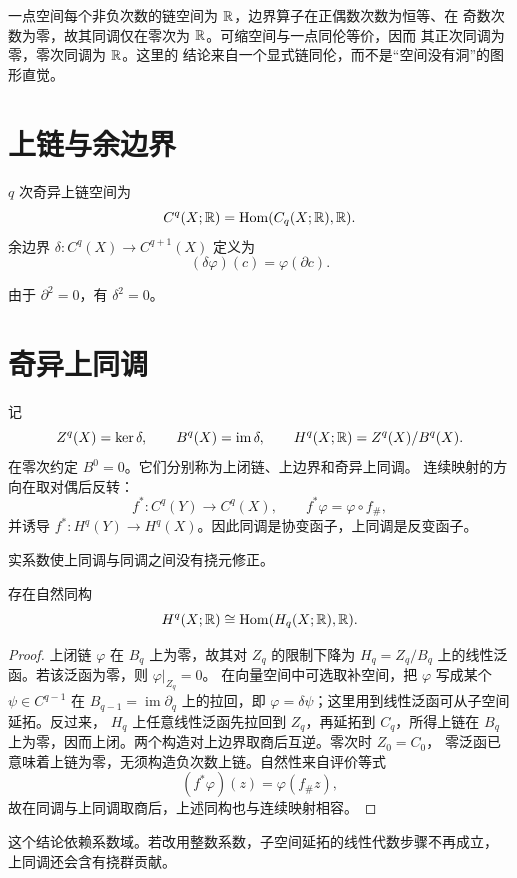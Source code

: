 一点空间每个非负次数的链空间为 $\mathbb{R}$，边界算子在正偶数次数为恒等、在
奇数次数为零，故其同调仅在零次为 $\mathbb{R}$。可缩空间与一点同伦等价，因而
其正次同调为零，零次同调为 $\mathbb{R}$。这里的
结论来自一个显式链同伦，而不是“空间没有洞”的图形直觉。

\section{上链与余边界}

\begin{definition}
$q$ 次奇异上链空间为
\[
 C^q(X;\mathbb{R})=\operatorname{Hom}(C_q(X;\mathbb{R}),\mathbb{R}).
\]
余边界 $\delta:C^q(X)\to C^{q+1}(X)$ 定义为
\[
 (\delta\varphi)(c)=\varphi(\partial c).
\]
\end{definition}

由于 $\partial^2=0$，有 $\delta^2=0$。

\section{奇异上同调}

记
\[
 Z^q(X)=\ker\delta,
 \qquad B^q(X)=\operatorname{im}\delta,
 \qquad H^q(X;\mathbb{R})=Z^q(X)/B^q(X).
\]
在零次约定 $B^0=0$。它们分别称为上闭链、上边界和奇异上同调。
连续映射的方向在取对偶后反转：
\[
 f^*:C^q(Y)\to C^q(X),\qquad f^*\varphi=\varphi\circ f_\#,
\]
并诱导 $f^*:H^q(Y)\to H^q(X)$。因此同调是协变函子，上同调是反变函子。

实系数使上同调与同调之间没有挠元修正。
\begin{proposition}\label{prop:real-cohomology-dual-homology}
存在自然同构
\[
 H^q(X;\mathbb{R})\cong\operatorname{Hom}(H_q(X;\mathbb{R}),\mathbb{R}).
\]
\end{proposition}
\begin{proof}
上闭链 $\varphi$ 在 $B_q$ 上为零，故其对 $Z_q$ 的限制下降为
$H_q=Z_q/B_q$ 上的线性泛函。若该泛函为零，则 $\varphi|_{Z_q}=0$。
在向量空间中可选取补空间，把 $\varphi$ 写成某个
$\psi\in C^{q-1}$ 在 $B_{q-1}=\operatorname{im}\partial_q$ 上的拉回，即
$\varphi=\delta\psi$；这里用到线性泛函可从子空间延拓。反过来，
$H_q$ 上任意线性泛函先拉回到 $Z_q$，再延拓到 $C_q$，所得上链在
$B_q$ 上为零，因而上闭。两个构造对上边界取商后互逆。零次时 $Z_0=C_0$，
零泛函已意味着上链为零，无须构造负次数上链。自然性来自评价等式
\[
 (f^*\varphi)(z)=\varphi(f_\#z),
\]
故在同调与上同调取商后，上述同构也与连续映射相容。
\end{proof}

这个结论依赖系数域。若改用整数系数，子空间延拓的线性代数步骤不再成立，
上同调还会含有挠群贡献。

